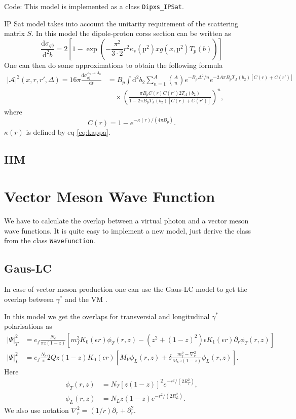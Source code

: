 \documentclass[a4paper,12pt,twoside]{article}
\newcommand{\code}[1]{\texttt{#1}}
\newcommand{\der}{\mathrm{d}}
\newcommand{\A}{\mathcal{A}}
\begin{document}
\label{IP Sat}
Code: This model is implemented as a class \code{Dipxs\_IPSat}.

IP Sat model takes into account the unitarity requirement of the scattering matrix $S$. In this model the dipole-proton corss section can be written as \cite{PhysRevD.68.114005}
\begin{equation}
	\frac{\der \sigma_{q\bar q}}{\der^2 b} = 2\left[1- \exp \left(-\frac{\pi^2}{3\cdot 2}r^2 \kappa_s(µ^2)xg(x,µ^2) T_p(b)\right) \right]
\end{equation}
One can then do some approximations to obtain the following formula
\begin{equation}
\begin{split}
	|\A|^2(x,r,r',\Delta) = 16\pi \frac{\der \sigma_{q\bar q}^{A_0 \rightarrow A_n}}{\der t} &= B_p \int \der^2 b_2 \sum_{n=1}^A \binom{A}{n} e^{-B_p \Delta^2/n} e^{-2A\pi B_p T_A(b_2)[C(r)+C(r')]} \\
	&\quad \times \left(\frac{\pi B_p C(r)C(r') 2 T_A(b_2)}{1-2\pi B_p T_A(b_2)[C(r)+C(r')]}\right)^n,
\end{split}
\end{equation}
where
\begin{equation}
	C(r) = 1-e^{-\kappa(r)/(4\pi B_p)}.
\end{equation}
$\kappa(r)$ is defined by eq \eqref{eq:kappa}.

\subsection{IIM}

\section{Vector Meson Wave Function}
We have to calculate the overlap between a virtual photon and a vector meson wave functions. It is quite easy to implement a new model, just derive the class from the class \code{WaveFunction}.

\subsection{Gaus-LC}
In case of vector meson production one can use the Gaus-LC model to get the overlap between $\gamma^*$ and the VM \cite{Kowalski:2006hc}.

In this model we get the overlaps for transversial and longitudinal $\gamma^*$ polarisations as
\begin{align}
	|\Psi |^2_T &= e_f \frac{N_c}{\pi z(1-z)} \left[ m_f^2 K_0(\epsilon r)\phi_T(r,z) - (z^2 + (1-z)^2) \epsilon K_1(\epsilon r) \partial_r \phi_T(r,z) \right] \\
	|\Psi |^2_L &= e_f \frac{N_c}{\pi} 2Q z (1-z)K_0(\epsilon r) \left[ M_V \phi_L(r,z) + \delta \frac{m_f^2 - \nabla_r^2}{M_V z(1-z)}\phi_L(r,z) \right].
\end{align}
Here
\begin{align}
	\phi_T(r,z) &= N_T \left[ z(1-z)\right]^2 e^{-r^2/(2R_T^2)}, \\
	\phi_L(r,z) &= N_L z(1-z) e^{-r^2/(2R_L^2)}.
\end{align}
We also use notation $\nabla_r^2 = (1/r)\partial_r + \partial_r^2$.
\end{document}
